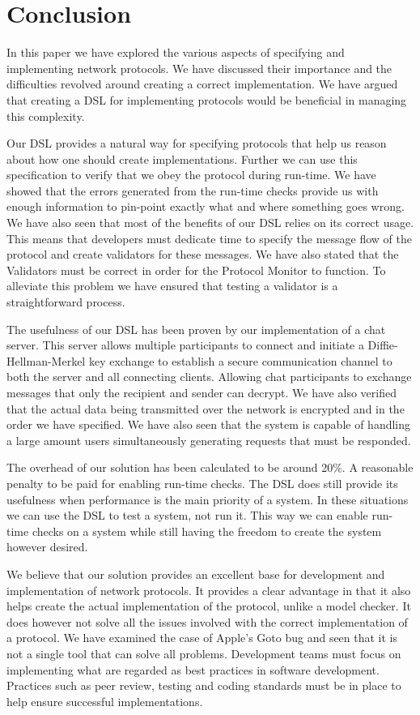 \section{Conclusion}
In this paper we have explored the various aspects of specifying and implementing network protocols. We have discussed their importance and the difficulties revolved around creating a correct implementation. We have argued that creating a DSL for implementing protocols would be beneficial in managing this complexity.

Our DSL provides a natural way for specifying protocols that help us reason about how one should create implementations. Further we can use this specification to verify that we obey the protocol during run-time. We have showed that the errors generated from the run-time checks provide us with enough information to pin-point exactly what and where something goes wrong. We have also seen that most of the benefits of our DSL relies on its correct usage. This means that developers must dedicate time to specify the message flow of the protocol and create validators for these messages. We have also stated that the Validators must be correct in order for the Protocol Monitor to function. To alleviate this problem we have ensured that testing a validator is a straightforward process.

The usefulness of our DSL has been proven by our implementation of a chat server. This server allows multiple participants to connect and initiate a Diffie-Hellman-Merkel key exchange to establish a secure communication channel to both the server and all connecting clients. Allowing chat participants to exchange messages that only the recipient and sender can decrypt. We have also verified that the actual data being transmitted over the network is encrypted and in the order we have specified. We have also seen that the system is capable of handling a large amount users simultaneously generating requests that must be responded.

The overhead of our solution has been calculated to be around 20\%. A reasonable penalty to be paid for enabling run-time checks. The DSL does still provide its usefulness when performance is the main priority of a system. In these situations we can use the DSL to test a system, not run it. This way we can enable run-time checks on a system while still having the freedom to create the system however desired.

We believe that our solution provides an excellent base for development and implementation of network protocols. It provides a clear advantage in that it also helps create the actual implementation of the protocol, unlike a model checker. It does however not solve all the issues involved with the correct implementation of a protocol. We have examined the case of Apple's Goto bug and seen that it is not a single tool that can solve all problems. Development teams must focus on implementing what are regarded as best practices in software development. Practices such as peer review, testing and coding standards must be in place to help ensure successful implementations. 


